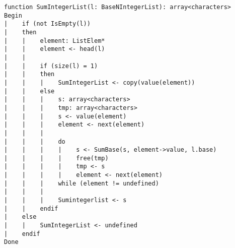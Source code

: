 \begin{lstlisting}[breaklines]
function SumIntegerList(l: BaseNIntegerList): array<characters>
Begin
|    if (not IsEmpty(l))
|    then
|    |    element: ListElem*
|    |    element <- head(l)
|    |
|    |    if (size(l) = 1)
|    |    then
|    |    |    SumIntegerList <- copy(value(element))
|    |    else
|    |    |    s: array<characters>
|    |    |    tmp: array<characters>
|    |    |    s <- value(element)
|    |    |    element <- next(element)
|    |    |
|    |    |    do
|    |    |    |    s <- SumBase(s, element->value, l.base)
|    |    |    |    free(tmp)
|    |    |    |    tmp <- s
|    |    |    |    element <- next(element)
|    |    |    while (element != undefined)
|    |    |
|    |    |    Sumintegerlist <- s
|    |    endif
|    else
|    |    SumIntegerList <- undefined
|    endif
Done
\end{lstlisting}
